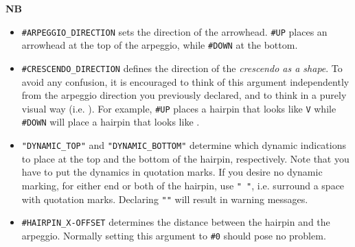 \textbf{NB} 
\begin{itemize}
\item \Verb|#ARPEGGIO_DIRECTION| sets the direction of the arrowhead. \Verb|#UP| places an arrowhead at the top of the arpeggio, while \Verb|#DOWN| at the bottom.
\item \Verb|#CRESCENDO_DIRECTION| defines the direction of the \textit{crescendo as a shape}. To avoid any confusion, it is encouraged to think of this argument independently from the arpeggio direction you previously declared, and to think in a purely visual way (i.e. ).  For example, \Verb|#UP| places a hairpin that looks like \Verb|V| while \Verb|#DOWN| will place a hairpin that looks like .
\item \Verb|"DYNAMIC_TOP"| and \verb|"DYNAMIC_BOTTOM"| determine which dynamic indications to place at the top and the bottom of the hairpin, respectively. Note that you have to put the dynamics in quotation marks. If you desire no dynamic marking, for either end or both of the hairpin, use \verb|" "|, i.e. surround a space with quotation marks. Declaring \verb|""| will result in warning messages.
\item \Verb|#HAIRPIN_X-OFFSET| determines the distance between the hairpin and the arpeggio. Normally setting this argument to \Verb|#0| should pose no problem.
\end{itemize}

